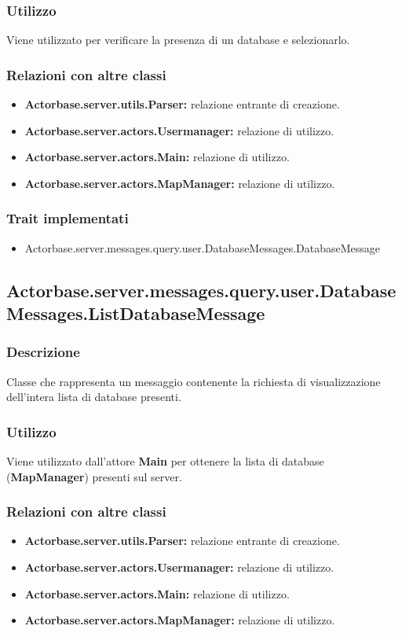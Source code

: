 \documentclass[a4paper]{article}
\begin{document}
			\subsubsection{Utilizzo}
				Viene utilizzato per verificare la presenza di un database e selezionarlo.
				
			\subsubsection{Relazioni con altre classi}
				\begin{itemize}
					\item \textbf{Actorbase.server.utils.Parser:} relazione entrante di creazione.
					\item \textbf{Actorbase.server.actors.Usermanager:} relazione di utilizzo.
					\item \textbf{Actorbase.server.actors.Main:} relazione di utilizzo.
					\item \textbf{Actorbase.server.actors.MapManager:} relazione di utilizzo.
				\end{itemize}
			\subsubsection{Trait implementati}
				\begin{itemize}
					\item Actorbase.server.messages.query.user.DatabaseMessages.DatabaseMessage
				\end{itemize}
				
		\subsection{Actorbase.server.messages.query.user.DatabaseMessages.ListDatabaseMessage}
			\subsubsection{Descrizione}
				Classe che rappresenta un messaggio contenente la richiesta di visualizzazione dell'intera lista di database presenti.
				
			\subsubsection{Utilizzo}
				Viene utilizzato dall'attore \textbf{Main} per ottenere la lista di database (\textbf{MapManager}) presenti sul server.
				
			\subsubsection{Relazioni con altre classi}
				\begin{itemize}
					\item \textbf{Actorbase.server.utils.Parser:} relazione entrante di creazione.
					\item \textbf{Actorbase.server.actors.Usermanager:} relazione di utilizzo.
					\item \textbf{Actorbase.server.actors.Main:} relazione di utilizzo.
					\item \textbf{Actorbase.server.actors.MapManager:} relazione di utilizzo.
				\end{itemize}
\end{document}
